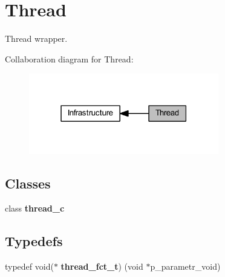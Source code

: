 \section{Thread}
\label{group___thread}


Thread wrapper.  


Collaboration diagram for Thread\+:
\nopagebreak
\begin{figure}[H]
\begin{center}
\leavevmode
\includegraphics[width=235pt]{group___thread}
\end{center}
\end{figure}
\subsection*{Classes}
\begin{DoxyCompactItemize}
\item 
class \textbf{ thread\+\_\+c}
\end{DoxyCompactItemize}
\subsection*{Typedefs}
\begin{DoxyCompactItemize}
\item 
typedef void($\ast$ \textbf{ thread\+\_\+fct\+\_\+t}) (void $\ast$p\+\_\+parametr\+\_\+void)
\end{DoxyCompactItemize}
